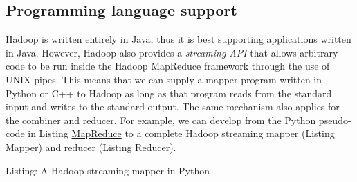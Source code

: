 \documentclass[]{krantz}
\newenvironment{Shaded}{\begin{snugshade}}{\end{snugshade}}
\newcommand{\KeywordTok}[1]{\textcolor[rgb]{0.13,0.29,0.53}{\textbf{#1}}}
\newcommand{\DecValTok}[1]{\textcolor[rgb]{0.00,0.00,0.81}{#1}}
\newcommand{\CharTok}[1]{\textcolor[rgb]{0.31,0.60,0.02}{#1}}
\newcommand{\SpecialCharTok}[1]{\textcolor[rgb]{0.00,0.00,0.00}{#1}}
\newcommand{\StringTok}[1]{\textcolor[rgb]{0.31,0.60,0.02}{#1}}
\newcommand{\ImportTok}[1]{#1}
\newcommand{\CommentTok}[1]{\textcolor[rgb]{0.56,0.35,0.01}{\textit{#1}}}
\newcommand{\VariableTok}[1]{\textcolor[rgb]{0.00,0.00,0.00}{#1}}
\newcommand{\ControlFlowTok}[1]{\textcolor[rgb]{0.13,0.29,0.53}{\textbf{#1}}}
\newcommand{\OperatorTok}[1]{\textcolor[rgb]{0.81,0.36,0.00}{\textbf{#1}}}
\newcommand{\BuiltInTok}[1]{#1}
\newcommand{\NormalTok}[1]{#1}
\begin{document}
\subsection{Programming language
support}\label{programming-language-support}

Hadoop is written entirely in Java, thus it is best supporting
applications written in Java. However, Hadoop also provides a
\emph{streaming API} that allows arbitrary code to be run inside the
Hadoop MapReduce framework through the use of UNIX pipes. This means
that we can supply a mapper program written in Python or C++ to Hadoop
as long as that program reads from the standard input and writes to the
standard output. The same mechanism also applies for the combiner and
reducer. For example, we can develop from the Python pseudo-code in
Listing \protect\hyperlink{list:parallel1}{MapReduce} to a complete
Hadoop streaming mapper (Listing
\protect\hyperlink{list:parallel2}{Mapper}) and reducer (Listing
\protect\hyperlink{list:parallel3}{Reducer}).

\begin{Shaded}
\end{Shaded}

Listing: A Hadoop streaming mapper in Python
\end{document}
